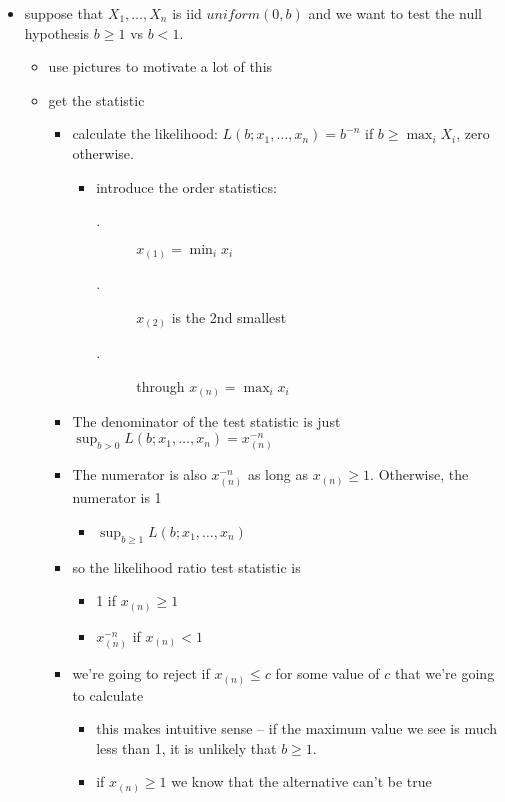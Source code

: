 \begin{itemize}
\item suppose that $X_1,\dots,X_n$ is iid $uniform(0,b)$ and we want
      to test the null hypothesis $b \geq 1$ vs $b < 1$.
\begin{itemize}
\item use pictures to motivate a lot of this
\item get the statistic
\begin{itemize}
\item calculate the likelihood: $L(b; x_1,\dots,x_n) = b^{-n}$ if
          $b \geq \max_i X_i$, zero otherwise.
\begin{itemize}
\item introduce the order statistics:
\begin{description}
\item[.] $x_{(1)} = \min_i x_i$
\item[.] $x_{(2)}$ is the 2nd smallest
\item[.] through $x_{(n)} = \max_i x_i$
\end{description}
\end{itemize}
\item The denominator of the test statistic is just $\sup_{b >
          0} L(b; x_1,\dots,x_n) = x_{(n)}^{-n}$
\item The numerator is also $x_{(n)}^{-n}$ as long as $x_{(n)}
          \geq 1$.  Otherwise, the numerator is 1
\begin{itemize}
\item $\sup_{b \geq 1} L(b; x_1,\dots,x_n)$
\end{itemize}
\item so the likelihood ratio test statistic is
\begin{itemize}
\item 1 if $x_{(n)} \geq 1$
\item $x_{(n)}^{-n}$ if $x_{(n)} < 1$
\end{itemize}
\item we're going to reject if $x_{(n)} \leq c$ for some value of
          $c$ that we're going to calculate
\begin{itemize}
\item this makes intuitive sense -- if the maximum value we
            see is much less than 1, it is unlikely that $b \geq
            1$.
\item if $x_{(n)} \geq 1$ we know that the alternative can't be true
\end{itemize}
\end{itemize}

\end{itemize}
\end{itemize}
